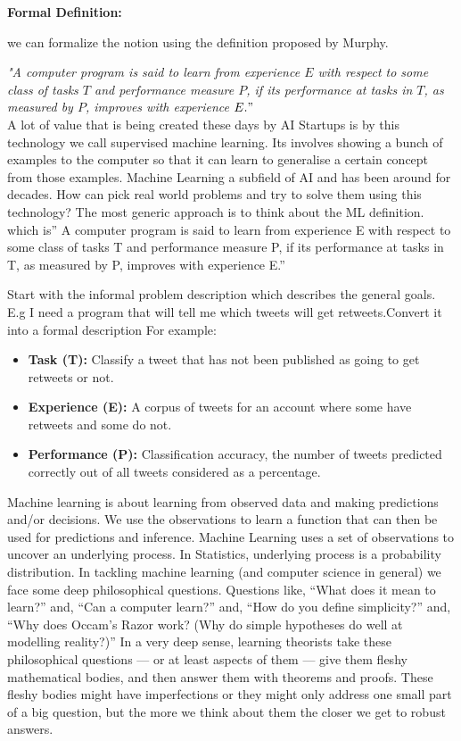 \documentclass[openany]{book}
\begin{document}
\noindent
\textbf{Formal Definition:} 

we can formalize the notion using the definition proposed by Murphy. 

\emph{"A computer program is said to learn from experience $E$ with respect to some class of tasks $T$ and performance measure $P$, if its performance at tasks in $T$, as measured by $P$, improves with experience $E . "$} \\

A lot of value that is being created these days by AI Startups is by this technology we call supervised machine learning. Its involves showing a bunch of examples to the computer so that it can learn to generalise a certain concept from those examples. Machine Learning a subfield of AI and has been around for decades. How can pick real world problems and try to solve them using this technology? The most generic approach is to think about the ML definition. which is” A computer program is said to learn from experience E with respect to some class of tasks T and performance measure P, if its performance at tasks in T, as measured by P, improves with experience E.”

Start with the informal problem description which describes the general goals. E.g  I need a program that will tell me which tweets will get retweets.Convert it into a formal description For example:

\begin{itemize}
    \item \textbf{Task (T):} Classify a tweet that has not been published as going to get retweets or not.

    \item \textbf{Experience (E):} A corpus of tweets for an account where some have retweets and some do not.

    \item \textbf{Performance (P):} Classification accuracy, the number of tweets predicted correctly out of all tweets considered as a percentage.

\end{itemize}

Machine learning is about learning from observed data and making predictions and/or decisions. We use the observations to learn a function that can then be used for predictions and inference. Machine Learning uses a set of observations to uncover an underlying process. In Statistics, underlying process is a probability distribution. In tackling machine learning (and computer science in general) we face some deep philosophical questions. Questions like, “What does it mean to learn?” and, “Can a computer learn?” and, “How do you define simplicity?” and, “Why does Occam’s Razor work? (Why do simple hypotheses do well at modelling reality?)” In a very deep sense, learning theorists take these philosophical questions — or at least aspects of them — give them fleshy mathematical bodies, and then answer them with theorems and proofs. These fleshy bodies might have imperfections or they might only address one small part of a big question, but the more we think about them the closer we get to robust answers. 
\end{document}
